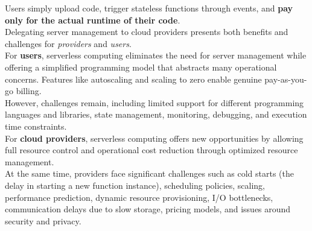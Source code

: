 Users simply upload code, trigger stateless functions through events, and \textbf{pay only for the actual runtime of their code}.\vspace{14pt}\\
Delegating server management to cloud providers presents both benefits and challenges for \textit{providers} and \textit{users}.\vspace{14pt}\\
For \textbf{users}, serverless computing eliminates the need for server management while offering a simplified programming model that abstracts many operational concerns. Features like autoscaling and scaling to zero enable genuine pay-as-you-go billing.\\
However, challenges remain, including limited support for different programming languages and libraries, state management, monitoring, debugging, and execution time constraints.\vspace{14pt}\\
For \textbf{cloud providers}, serverless computing offers new opportunities by allowing full resource control and operational cost reduction through optimized resource management.\\
At the same time, providers face significant challenges such as cold starts (the delay in starting a new function instance), scheduling policies, scaling, performance prediction, dynamic resource provisioning, I/O bottlenecks, communication delays due to slow storage, pricing models, and issues around security and privacy.\cite{banaei2022etas}